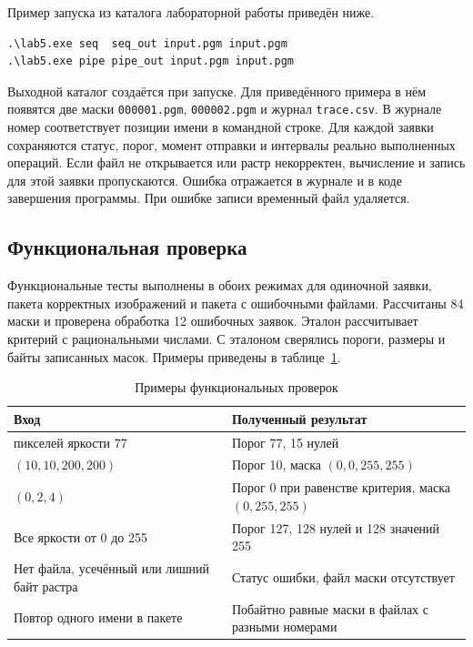 \noindent Пример запуска из каталога лабораторной работы приведён ниже.
\begin{lstlisting}[numbers=none]
.\lab5.exe seq  seq_out input.pgm input.pgm
.\lab5.exe pipe pipe_out input.pgm input.pgm
\end{lstlisting}

Выходной каталог создаётся при запуске. Для приведённого примера в нём появятся две маски \texttt{000001.pgm}, \texttt{000002.pgm} и журнал \texttt{trace.csv}. В журнале номер соответствует позиции имени в командной строке. Для каждой заявки сохраняются статус, порог, момент отправки и интервалы реально выполненных операций. Если файл не открывается или растр некорректен, вычисление и запись для этой заявки пропускаются. Ошибка отражается в журнале и в коде завершения программы. При ошибке записи временный файл удаляется.

\clearpage\subsection{Функциональная проверка}
Функциональные тесты выполнены в обоих режимах для одиночной заявки, пакета корректных изображений и пакета с ошибочными файлами. Рассчитаны 84 маски и проверена обработка 12 ошибочных заявок. Эталон рассчитывает критерий с рациональными числами. С эталоном сверялись пороги, размеры и байты записанных масок. Примеры приведены в таблице~\ref{tab:tests}.

\begin{table}[H]\caption{Примеры функциональных проверок}\label{tab:tests}
\centering
\begin{tabularx}{\textwidth}{|>{\raggedright\arraybackslash}X|>{\raggedright\arraybackslash}X|}\hline
Вход & Полученный результат\\\hline
15 пикселей яркости 77 & Порог 77, 15 нулей\\\hline
\((10,10,200,200)\) & Порог 10, маска \((0,0,255,255)\)\\\hline
\((0,2,4)\) & Порог 0 при равенстве критерия, маска \((0,255,255)\)\\\hline
Все яркости от 0 до 255 & Порог 127, 128 нулей и 128 значений 255\\\hline
Нет файла, усечённый или лишний байт растра & Статус ошибки, файл маски отсутствует\\\hline
Повтор одного имени в пакете & Побайтно равные маски в файлах с разными номерами\\\hline
\end{tabularx}
\end{table}


